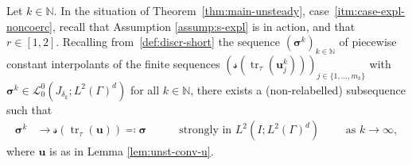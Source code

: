 \documentclass[reqno,a4paper]{amsart}
\def\vec#1{\boldsymbol{#1}}
\def\tr{\mathop{\mathrm{tr}}\nolimits}
\def\bu{\vec{u}}
\def\bsigma{\vec{\sigma}}
\def\Srel{\vec{\mathcal{s}}}
\begin{document}
	\begin{lemma}\label{lem:unst-conv-s-c1} Let $k\in\mathbb{N}$. 
		In the situation of Theorem~\ref{thm:main-unsteady}, case~\ref{itm:case-expl-noncoerc}, recall that Assumption \ref{assump:s-expl} is in action, and that $r \in [1,2]$. 
  Recalling from~\eqref{def:discr-short} the sequence $(\bsigma^{k})_{k\in\mathbb{N}}$ of piecewise constant interpolants of the finite sequences $(\Srel(\tr_\tau(\bu^k_j)))_{j\in\{1,...,m_{k}\}}$ with $	\bsigma^k  \in \mathcal{L}^0_0(J_{\delta_k}; L^{2}(\Gamma)^d) $ for all $k\in\mathbb{N}$, there exists a (non-relabelled)  subsequence such that  
		\begin{align}\label{eq:streetwalker}
			\bsigma^k 
			& \to  \Srel(\tr_{\tau}(\bu)) \eqqcolon \bsigma  \quad 
			&&\text{ strongly in } L^{2}(I;L^{2}(\Gamma)^d) \qquad \text{ as } k \to \infty, 
		\end{align}
		where $\bu$ is as in Lemma \ref{lem:unst-conv-u}.
	\end{lemma}
\end{document}
